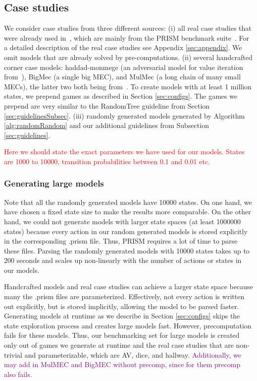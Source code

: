 \subsection{Case studies}
We consider case studies from three different sources: 
(i) all real case studies that were already used in~\cite{gandalf}, which are mainly from the PRISM benchmark suite~\cite{PRISMben}.
For a detailed description of the real case studies see Appendix \ref{sec:appendix}.
We omit models that are already solved by pre-computations.
(ii) several handcrafted corner case models: haddad-monmege (an adversarial model for value iteration from~\cite{haddadmonmege}), BigMec (a single big MEC), and MulMec (a long chain of many small MECs), the latter two both being from~\cite{gandalf}.
To create models with at least 1 million states, we prepend games as described in Section \ref{sec:configs}.
The games we prepend are very similar to the RandomTree guideline from Section \ref{sec:guidelinesSubsec}.
(iii) randomly generated models generated by Algorithm \ref{alg:randomRandom} and our additional guidelines from Subsection \ref{sec:guidelines}.

\textcolor{red}{Here we should state the exact parameters we have used for our models. States are 1000 to 10000, transition probabilities between 0.1 and 0.01 etc.}

\subsubsection*{Generating large models}
Note that all the randomly generated models have 10000 states. On one hand, we have chosen a fixed state size to make the results more comparable.
On the other hand, we could not generate models with larger state spaces (at least 1000000 states) because every action in our random generated models is stored explicitly
in the corresponding .prism file. Thus, PRISM requires a lot of time to parse these files. Parsing the randomly generated models with 10000 states takes
up to 200 seconds and scales up non-linearly with the number of actions or states in our models.

Handcrafted models and real case studies can achieve a larger state space because many the .prism files are parameterized.
Effectively, not every action is written out explicitly, but is stored implicitly, allowing the model to be parsed faster.
Generating models at runtime as we describe in Section \ref{sec:configs} skips the state exploration process and 
creates large models fast. However, precomputation fails for these models.
Thus, our benchmarking set for large models is created only out of games we generate at runtime and the real case studies that are non-trivial and parameterizable, 
which are AV, dice, and hallway. \textcolor{purple}{Additionally, we may add in MulMEC and BigMEC without precomp, since for them precomp also fails.}

